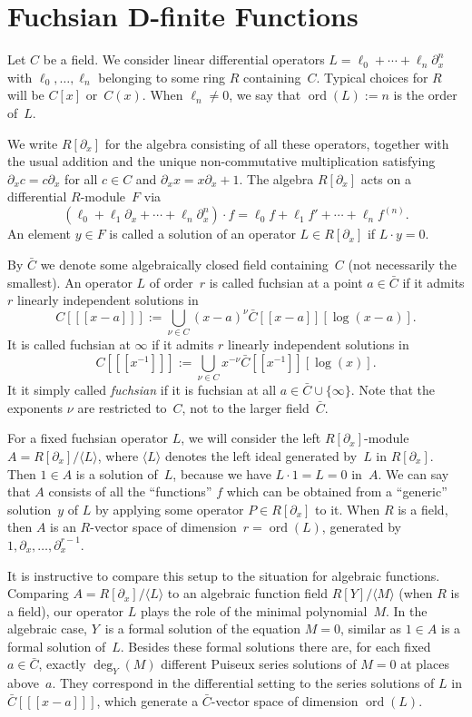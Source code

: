 \documentclass{sig-alternate}
\def\ord{\operatorname{ord}}
\def\<#1>{\langle#1\rangle}
\begin{document}
\section{Fuchsian D-finite Functions}

Let $C$ be a field. We consider linear differential operators
$L=\ell_0+\cdots+\ell_n\partial_x^n$ with $\ell_0,\dots,\ell_n$ belonging to some ring
$R$ containing~$C$.
Typical choices for $R$ will be $C[x]$ or~$C(x)$.
When $\ell_n\neq0$, we say that $\ord(L):=n$ is the order of~$L$.

We write $R[\partial_x]$ for the algebra consisting of all these operators, together
with the usual addition and the unique non-commutative multiplication satisfying
$\partial_xc=c\partial_x$ for all $c\in C$ and $\partial_xx=x\partial_x+1$.
The algebra $R[\partial_x]$ acts on a differential $R$-module~$F$ via
\[
  (\ell_0+\ell_1\partial_x+\cdots+\ell_n\partial_x^n)\cdot f=
   \ell_0f + \ell_1f' + \cdots + \ell_n f^{(n)}.
\]
An element $y\in F$ is called a solution of an operator $L\in R[\partial_x]$ if
$L\cdot y=0$.

By $\bar C$ we denote some algebraically closed field containing~$C$ (not necessarily the smallest).
An operator $L$ of order~$r$ is called fuchsian at a point $a\in\bar C$ if
it admits $r$ linearly independent solutions in
\[
  C[[[x-a]]] := \bigcup_{\nu\in C} (x-a)^\nu\bar C[[x-a]][\log(x-a)].
\]
It is called fuchsian at $\infty$ if it admits $r$ linearly independent solutions in
\[
  C[[[x^{-1}]]] := \bigcup_{\nu\in C} x^{-\nu} \bar C[[x^{-1}]][\log(x)].
\]
It it simply called \emph{fuchsian} if it is fuchsian at all $a\in\bar C\cup\{\infty\}$.
Note that the exponents $\nu$ are restricted to~$C$, not to the larger field~$\bar C$.

For a fixed fuchsian operator $L$, we will consider the left $R[\partial_x]$-module
$A=R[\partial_x]/\<L>$, where $\<L>$ denotes the left ideal generated by~$L$ in
$R[\partial_x]$.  Then $1\in A$ is a solution of~$L$, because we have $L\cdot 1=L=0$
in~$A$. We can say that $A$ consists of all the ``functions'' $f$ which can be
obtained from a ``generic'' solution~$y$ of $L$ by applying some operator $P\in
R[\partial_x]$ to it. When $R$ is a field, then $A$ is an $R$-vector space of
dimension~$r=\ord(L)$, generated by $1,\partial_x,\dots,\partial_x^{r-1}$.

It is instructive to compare this setup to the situation for algebraic
functions. Comparing $A=R[\partial_x]/\<L>$ to an algebraic function field $R[Y]/\<M>$
(when $R$ is a field), our operator $L$ plays the role of the minimal
polynomial~$M$. In the algebraic case, $Y$~is a formal solution of the equation
$M=0$, similar as $1\in A$ is a formal solution of~$L$. Besides these formal
solutions there are, for each fixed $a\in\bar C$, exactly $\deg_Y(M)$ different
Puiseux series solutions of $M=0$ at places above~$a$. They correspond in the
differential setting to the series solutions of $L$ in $\bar C[[[x-a]]]$, which
generate a $\bar C$-vector space of dimension $\ord(L)$.
\end{document}
